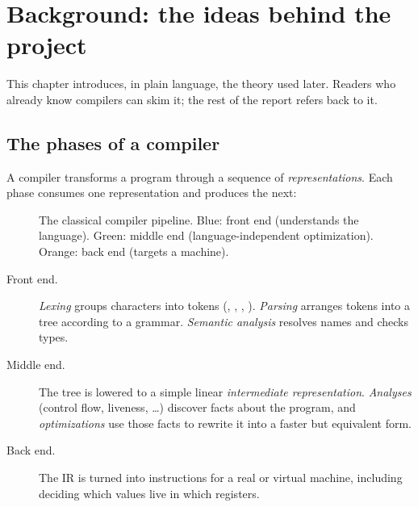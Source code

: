 \chapter{Background: the ideas behind the project}
\label{ch:background}
This chapter introduces, in plain language, the theory used later. Readers who already know compilers can skim it; the rest of the report refers back to it.

\section{The phases of a compiler}
A compiler transforms a program through a sequence of \emph{representations}. Each phase consumes one representation and produces the next:

\begin{figure}[H]\centering
{}
\caption{The classical compiler pipeline. Blue: front end (understands the language). Green: middle end (language-independent optimization). Orange: back end (targets a machine).}
\end{figure}

\begin{description}
  \item[Front end.] \emph{Lexing} groups characters into tokens (, , \code{=}, ). \emph{Parsing} arranges tokens into a tree according to a grammar. \emph{Semantic analysis} resolves names and checks types.
  \item[Middle end.] The tree is lowered to a simple linear \emph{intermediate representation}. \emph{Analyses} (control flow, liveness, \ldots) discover facts about the program, and \emph{optimizations} use those facts to rewrite it into a faster but equivalent form.
  \item[Back end.] The IR is turned into instructions for a real or virtual machine, including deciding which values live in which registers.
\end{description}

